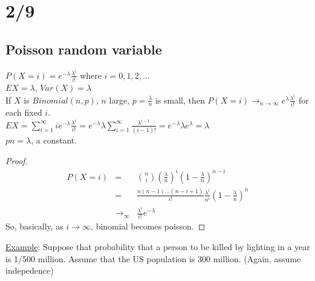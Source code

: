\section*{2/9}
  \subsection*{Poisson random variable}
    $P(X = i) = e^{-\lambda}\frac{\lambda^i}{i!}$ where $i=0, 1, 2, \ldots$\\
    $EX = \lambda$, $Var(X) = \lambda$\\
    If $X$ is $Binomial(n,p)$, $n$ large, $p = \frac{\lambda}{n}$ is small,
    then $P(X = i) \to_{n \to \infty} e^{\lambda}\frac{\lambda^i}{i!}$ for
    each fixed $i$.\\
    $EX = \sum_{i = 1}^{\infty} ie^{-\lambda} \frac{\lambda^i}{i!} = 
    e^{-\lambda}\lambda \sum_{i = 1}^{\infty} \frac{\lambda^{i-1}}{(i-1)!}
    = e^{-\lambda}\lambda e^{\lambda} = \lambda$\\
    $pn = \lambda$, a constant.\\
    \begin{proof}
      \begin{eqnarray*}
      P(X = i) & = & \binom{n}{i}\left(\frac{\lambda}{n}\right)^i \left(1 - 
      \frac{\lambda}{n}\right)^{n-i}\\
      & = & \frac{n(n-1)\ldots(n-i+1)}{i!} \frac{\lambda^i}{n^i} \left(1- 
      \frac{\lambda}{n}\right)^n\\
      & \to_{\infty} & \frac{\lambda^i}{i!} e^{-\lambda}
      \end{eqnarray*}
      So, basically, as $i \to \infty$, binomial becomes poisson.
    \end{proof}
    \underline{Example}: Suppose that probability that a person to be killed
      by lighting in a year is 1/500 million. Assume that the US population is
      300 million. (Again, assume indepedence)
